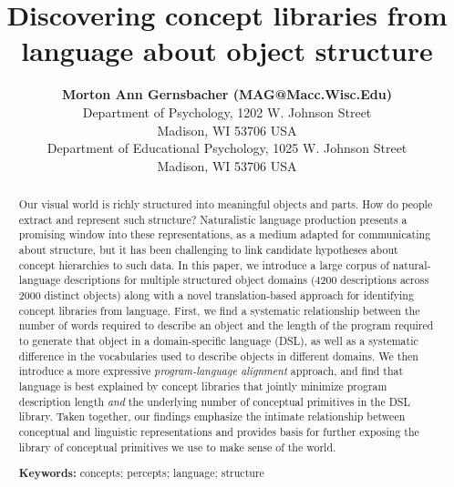 \documentclass[10pt,letterpaper]{article}
\title{Discovering concept libraries from language about object structure}
\author{{\large \bf Morton Ann Gernsbacher (MAG@Macc.Wisc.Edu)} \\
  Department of Psychology, 1202 W. Johnson Street \\
  Madison, WI 53706 USA
  \AND {\large \bf Sharon J.~Derry (SDJ@Macc.Wisc.Edu)} \\
  Department of Educational Psychology, 1025 W. Johnson Street \\
  Madison, WI 53706 USA}
\begin{document}
\maketitle


\begin{abstract}
Our visual world is richly structured into meaningful objects and parts. 
How do people extract and represent such structure?
Naturalistic language production presents a promising window into these representations, as a medium adapted for communicating about structure, but it has been challenging to link candidate hypotheses about concept hierarchies to such data.
In this paper, we introduce a large corpus of natural-language descriptions for multiple structured object domains ($4200$ descriptions across 2000 distinct objects) along with a novel translation-based approach for identifying concept libraries from language.
First, we find a systematic relationship between the number of words required to describe an object and the length of the program required to generate that object in a domain-specific language (DSL), as well as a systematic difference in the vocabularies used to describe objects in different domains. 
We then introduce a more expressive \textit{program-language alignment} approach, and find that language is best explained by concept libraries that jointly minimize program description length \textit{and} the underlying number of conceptual primitives in the DSL library.
Taken together, our findings emphasize the intimate relationship between conceptual and linguistic representations and provides basis for further exposing the library of conceptual primitives we use to make sense of the world. 


\textbf{Keywords:} concepts; percepts; language; structure
\end{abstract}


\end{document}
